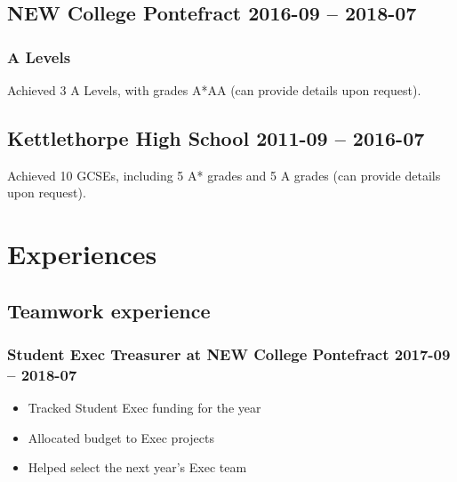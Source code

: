 \documentclass[10pt]{extarticle}
\begin{document}
    \subsection{NEW College Pontefract
        \hfill 2016-09 -- 2018-07}
        \subsubsection{A Levels}
            Achieved 3 A Levels, with grades A*AA (can provide details upon request).
            \begin{comment}
                \begin{tabular}{cccc}
                    \textbf{Subject} & \textbf{Exam Board} & \textbf{AS/A2} &
                    \textbf{Grade}\\
                    Mathematics & AQA & A2 & A* \\
                    Further Mathematics & AQA & A2 & A \\
                    Computer Science & OCR & A2 & A \\
                    Physics & AQA & AS & A
                \end{tabular}
            \end{comment}
    \subsection{Kettlethorpe High School
        \hfill 2011-09 -- 2016-07}
        Achieved 10 GCSEs, including 5 A* grades and 5 A grades (can provide details
        upon request).
\section{Experiences}
    \subsection{Teamwork experience}
        \subsubsection{Student Exec Treasurer at NEW College Pontefract
        \hfill 2017-09 -- 2018-07}
            \begin{itemize}
                \item Tracked Student Exec funding for the year
                \item Allocated budget to Exec projects
                \item Helped select the next year's Exec team
            \end{itemize}
\end{document}
